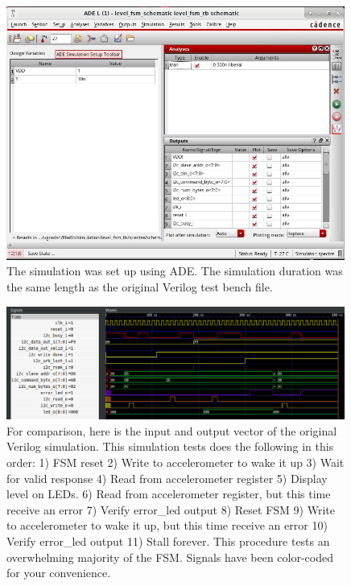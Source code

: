 \documentclass[11pt]{article}
\begin{document}
\begin{figure}[H]
    \centering
\includegraphics[width=0.99\textwidth]{simsetup.png}
    \caption{The simulation was set up using ADE. The simulation duration was the same length as the original Verilog test bench file.}
\end{figure}
\pagebreak


\begin{figure}[H]
    \centering
\includegraphics[width=0.99\textwidth]{verilogtb.png}
    \caption{For comparison, here is the input and output vector of the original Verilog simulation. This simulation tests does the following in this order: 1) FSM reset 2) Write to accelerometer to wake it up 3) Wait for valid response 4) Read from accelerometer register 5) Display level on LEDs. 6) Read from accelerometer register, but this time receive an error 7) Verify error\_led output 8) Reset FSM 9) Write to accelerometer to wake it up, but this time receive an error 10) Verify error\_led output 11) Stall forever. This procedure tests an overwhelming majority of the FSM. Signals have been color-coded for your convenience.}
\end{figure}
\end{document}

